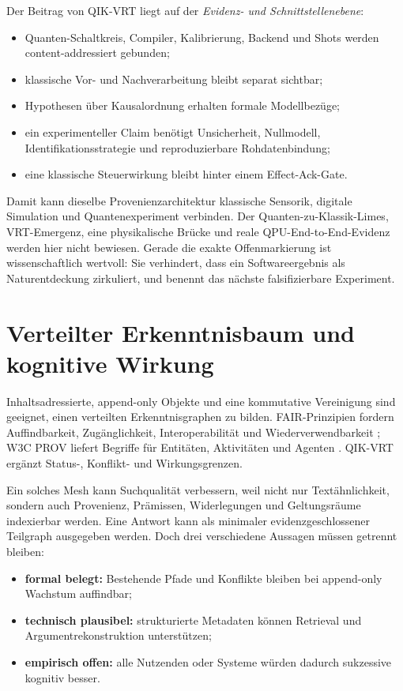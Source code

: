 \documentclass[11pt,a4paper,oneside]{article}
\begin{document}
Der Beitrag von QIK-VRT liegt auf der \emph{Evidenz- und Schnittstellenebene}:

\begin{itemize}
  \item Quanten-Schaltkreis, Compiler, Kalibrierung, Backend und Shots werden
  content-addressiert gebunden;
  \item klassische Vor- und Nachverarbeitung bleibt separat sichtbar;
  \item Hypothesen über Kausalordnung erhalten formale Modellbezüge;
  \item ein experimenteller Claim benötigt Unsicherheit, Nullmodell,
  Identifikationsstrategie und reproduzierbare Rohdatenbindung;
  \item eine klassische Steuerwirkung bleibt hinter einem Effect-Ack-Gate.
\end{itemize}

Damit kann dieselbe Provenienzarchitektur klassische Sensorik, digitale
Simulation und Quantenexperiment verbinden. Der Quanten-zu-Klassik-Limes,
VRT-Emergenz, eine physikalische Brücke und reale QPU-End-to-End-Evidenz werden
hier nicht bewiesen. Gerade die exakte Offenmarkierung ist wissenschaftlich
wertvoll: Sie verhindert, dass ein Softwareergebnis als Naturentdeckung
zirkuliert, und benennt das nächste falsifizierbare Experiment.

\section{Verteilter Erkenntnisbaum und kognitive Wirkung}

Inhaltsadressierte, append-only Objekte und eine kommutative Vereinigung sind
geeignet, einen verteilten Erkenntnisgraphen zu bilden. FAIR-Prinzipien fordern
Auffindbarkeit, Zugänglichkeit, Interoperabilität und Wiederverwendbarkeit
\cite{Wilkinson2016}; W3C PROV liefert Begriffe für Entitäten, Aktivitäten und
Agenten \cite{W3CPROV2013}. QIK-VRT ergänzt Status-, Konflikt- und
Wirkungsgrenzen.

Ein solches Mesh kann Suchqualität verbessern, weil nicht nur Textähnlichkeit,
sondern auch Provenienz, Prämissen, Widerlegungen und Geltungsräume indexierbar
werden. Eine Antwort kann als minimaler evidenzgeschlossener Teilgraph
ausgegeben werden. Doch drei verschiedene Aussagen müssen getrennt bleiben:

\begin{itemize}
  \item \textbf{formal belegt:} Bestehende Pfade und Konflikte bleiben bei
  append-only Wachstum auffindbar;
  \item \textbf{technisch plausibel:} strukturierte Metadaten können Retrieval
  und Argumentrekonstruktion unterstützen;
  \item \textbf{empirisch offen:} alle Nutzenden oder Systeme würden dadurch
  sukzessive kognitiv besser.
\end{itemize}
\end{document}
